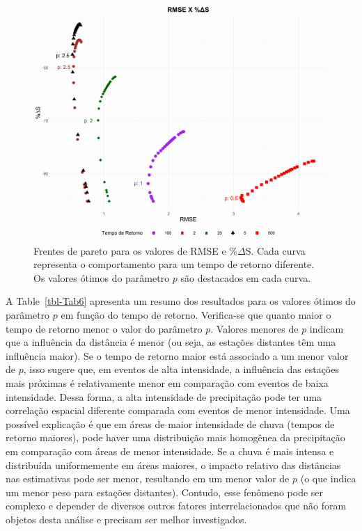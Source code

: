 \documentclass[
]{agujournal2019}
\begin{document}
\begin{figure}

\begin{minipage}{\linewidth}

\includegraphics{Figuras/Figura9.png}

\end{minipage}%

\caption{\label{fig-Figura9}Frentes de pareto para os valores de RMSE e
\%\(\Delta\)S. Cada curva representa o comportamento para um tempo de
retorno diferente. Os valores ótimos do parâmetro \(p\) são destacados
em cada curva.}

\end{figure}%

A Table~\ref{tbl-Tab6} apresenta um resumo dos resultados para os
valores ótimos do parâmetro \(p\) em função do tempo de retorno.
Verifica-se que quanto maior o tempo de retorno menor o valor do
parâmetro \(p\). Valores menores de \(p\) indicam que a influência da
distância é menor (ou seja, as estações distantes têm uma influência
maior). Se o tempo de retorno maior está associado a um menor valor de
\(p\), isso sugere que, em eventos de alta intensidade, a influência das
estações mais próximas é relativamente menor em comparação com eventos
de baixa intensidade. Dessa forma, a alta intensidade de precipitação
pode ter uma correlação espacial diferente comparada com eventos de
menor intensidade. Uma possível explicação é que em áreas de maior
intensidade de chuva (tempos de retorno maiores), pode haver uma
distribuição mais homogênea da precipitação em comparação com áreas de
menor intensidade. Se a chuva é mais intensa e distribuída uniformemente
em áreas maiores, o impacto relativo das distâncias nas estimativas pode
ser menor, resultando em um menor valor de \(p\) (o que indica um menor
peso para estações distantes). Contudo, esse fenômeno pode ser complexo
e depender de diversos outros fatores interrelacionados que não foram
objetos desta análise e precisam ser melhor investigados.
\end{document}
